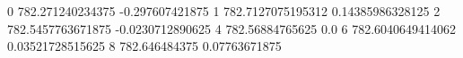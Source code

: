 0 782.271240234375 -0.297607421875
1 782.7127075195312 0.14385986328125
2 782.5457763671875 -0.0230712890625
4 782.56884765625 0.0
6 782.6040649414062 0.03521728515625
8 782.646484375 0.07763671875
